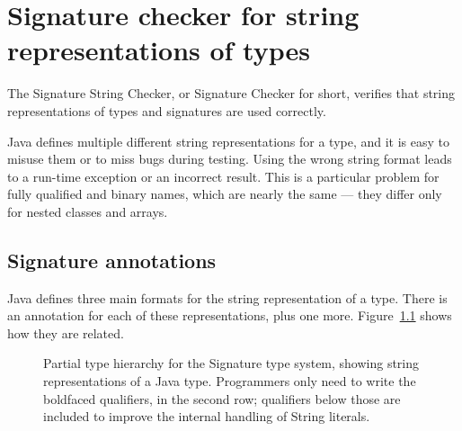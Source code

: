 \htmlhr
\chapter{Signature checker for string representations of types\label{signature-checker}}

The Signature String Checker, or Signature Checker for short, verifies that
string representations of types and signatures are used correctly.

Java defines multiple different string representations for a type, and it is easy to
misuse them or to miss bugs during testing.  Using the wrong string format
leads to a run-time exception or an incorrect result.  This is a particular
problem for fully qualified and binary names, which are nearly the same ---
they differ only for nested classes and arrays.


\section{Signature annotations\label{signature-annotations}}

Java defines three main formats for the string representation of a type.
There is an annotation for each of these representations, plus one more.
Figure~\ref{fig:signature-hierarchy} shows how they are related.

\begin{figure}
\caption{Partial type hierarchy for the Signature type system, showing
  string representations of a Java type.  Programmers only need to write
  the boldfaced qualifiers, in the second row; qualifiers below those are
  included to improve the internal handling of String literals.}
\label{fig:signature-hierarchy}
\end{figure}


